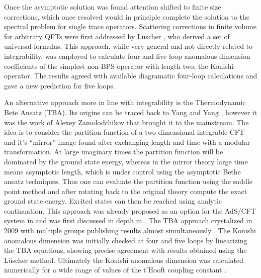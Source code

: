Once the asymptotic solution was found attention shifted to finite size corrections, which once resolved would in principle complete the solution to the spectral problem for single trace operators. 
Scattering corrections in finite volume for arbitrary QFTs were first addressed by L\"{u}scher \cite{Luscher:1986}, who derived a set of universal formulas. 
This approach, while very general and not directly related to integrability, was employed to calculate four \cite{Bajnok:2008bm} and five loop anomalous dimension coefficients \cite{Bajnok:2009vm} of the simplest non-BPS operator with length two, the Konishi operator.
The results agreed with available diagramatic four-loop calculations \cite{Fiamberti:2007rj} and gave a new prediction for five loops.

An alternative approach more in line with integrability is the Thermodynamic Bete Ansatz (TBA).
Its origins can be traced back to Yang and Yang \cite{Yang}, however it was the work of Alexey Zamolodchikov \cite{Zamolodchikov1, Zamolodchikov2} that brought it to the mainstream. 
The idea is to consider the partition function of a two dimensional integrable CFT and it's ``mirror'' image found after exchanging length and time with a modular transformation.
At large imaginary times the partition function will be dominated by the ground state energy, whereas in the mirror theory large time means asymptotic length, which is under control using the asymptotic Bethe ansatz techniques.
Thus one can evaluate the partition function using the saddle point method and after rotating back to the original theory compute the exact ground state energy. 
Excited states can then be reached using analytic continuation. 
This approach was already proposed as an option for the AdS/CFT system in \cite{Ambjorn:2005wa} and was first discussed in depth in \cite{Arutyunov:2007tc}.
The TBA approach crystalized in 2009 with multiple groups publishing results almost simultaneously \cite{Gromov:2009tv, Bombardelli:2009ns, Gromov:2009bc, Arutyunov:2009ur}.
The Konishi anomalous dimension was initially checked at four \cite{Gromov:2009bc} and five \cite{Arutyunov:2010gb, Balog:2010xa} loops by linearizing the TBA equations, showing precise agreement with results obtained using the L\"{u}scher method.
Ultimately the Konishi anomalous dimension was calculated numerically for a wide range of values of the t'Hooft coupling constant \cite{Gromov:2009zb}.

